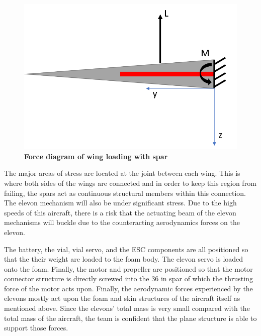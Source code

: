     \begin{figure}[H]
        \centering
        \includegraphics[scale=0.7]{homeworks/homework4/report/Figure/forces_wing.png}
        \caption{\textbf{Force diagram of wing loading with spar}}
        \label{fig:wing_cant}
    \end{figure}
    
    The major areas of stress are located at the joint between each wing. This is where both sides of the wings are connected and in order to keep this region from failing, the spars act as continuous structural members within this connection. The elevon mechanism will also be under significant stress. Due to the high speeds of this aircraft, there is a risk that the actuating beam of the elevon mechanisms will buckle due to the counteracting aerodynamics forces on the elevon. 
    
    The battery, the vial, vial servo, and the ESC components are all positioned so that the their weight are loaded to the foam body. The elevon servo is loaded onto the foam. Finally, the motor and propeller are positioned so that the motor connector structure is directly screwed into the 36 in spar of which the thrusting force of the motor acts upon. Finally, the aerodynamic forces experienced by the elevons mostly act upon the foam and skin structures of the aircraft itself as mentioned above. Since the elevons' total mass is very small compared with the total mass of the aircraft, the team is confident that the plane structure is able to support those forces. 


